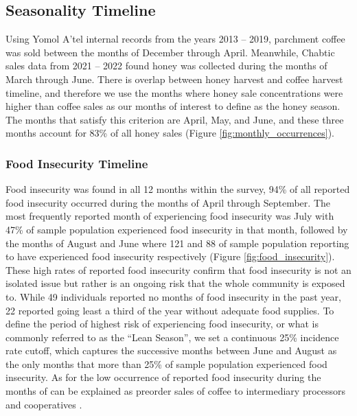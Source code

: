 \documentclass[../main.tex]{subfiles}
\begin{document}
\subsection{Seasonality Timeline}

Using Yomol A’tel internal records from the years 2013 – 2019, parchment coffee was sold between the months of December through April.  Meanwhile, Chabtic sales data from 2021 – 2022 found honey was collected during the months of March through June.  There is overlap between honey harvest and coffee harvest timeline, and therefore we use the months where honey sale concentrations were higher than coffee sales as our months of interest to define as the honey season. The months that satisfy this criterion are April, May, and June, and these three months account for 83\% of all honey sales (Figure \ref{fig:monthly_occurrences}).

\subsubsection{Food Insecurity Timeline}

Food insecurity was found in all 12 months within the survey, 94\% of all reported food insecurity occurred during the months of April through September.  The most frequently reported month of experiencing food insecurity was July with 47\% of sample population experienced food insecurity in that month, followed by the months of August and June where 121 and 88 of sample population reporting to have experienced food insecurity respectively (Figure \ref{fig:food_insecurity}). These high rates of reported food insecurity confirm that food insecurity is not an isolated issue but rather is an ongoing risk that the whole community is exposed to. While 49 individuals reported no months of food insecurity in the past year, 22 reported going least a third of the year without adequate food supplies. To define the period of highest risk of experiencing food insecurity, or what is commonly referred to as the “Lean Season”, we set a continuous 25\% incidence rate cutoff, which captures the successive months between June and August as the only months that more than 25\% of sample population experienced food insecurity. As for the low occurrence of reported food insecurity during the months of can be explained as preorder sales of coffee to intermediary processors and cooperatives \parencite{macchiavello_competition_2021}.
\end{document}
